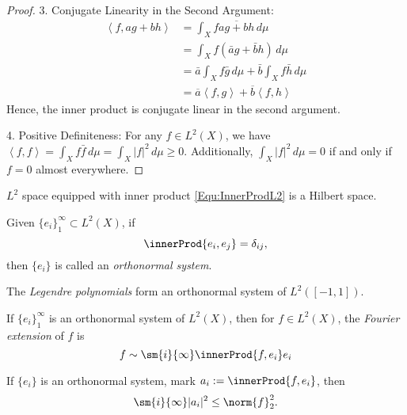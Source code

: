 \begin{proof}
3. Conjugate Linearity in the Second Argument:
   \begin{align*}
   \left<f, ag + bh\right> &= \int_{X}f\overline{ag + bh}\,
   d\mu \\
   &= \int_{X}f(\bar{a}g + \bar{b}h)\,d\mu \\
   &= \bar{a}\int_{X}f\bar{g}\,d\mu + \bar{b}\int_{X}f\bar{h}\,
   d\mu \\
   &= \overline{a}\left<f,g\right> + \overline{b}\left<f,h\right>
   \end{align*}
   Hence, the inner product is conjugate linear in the 
   second argument.

4. Positive Definiteness:
   For any $f \in L^2(X)$, we have $\left<f,f\right> = 
   \int_{X}f\bar{f}\,d\mu = \int_{X}|f|^2\,d\mu \geq 0$. 
   Additionally, $\int_{X}|f|^2\,d\mu = 0$ if and only if 
   $f = 0$ almost everywhere.
\end{proof}
\begin{thm}
    $L^{2}$ space equipped with inner product \eqref{Equ:InnerProdL2} 
    is a Hilbert space. 
\end{thm}
\begin{defn}
    \label{Defn:OrthonormalSet}
    Given $\{e_{i}\}_{1}^{\infty}\subset L^{2}(X)$, if 
    \begin{displaymath}
        \innerProd{e_i,e_{j}}=\delta_{ij},
    \end{displaymath}
    then $\{e_{i}\}$ is called an \textit{orthonormal system}.
\end{defn}
\begin{exm}
    The \textit{Legendre polynomials} form an orthonormal 
    system of $L^{2}([-1,1])$.
\end{exm}
\begin{defn}
    If $\{e_{i}\}_{1}^{\infty}$ is an orthonormal 
    system of $L^{2}(X)$, then for $f\in L^{2}(X)$, the 
    \textit{Fourier extension} of $f$ is 
    \begin{displaymath}
        f\sim\sm{i}{\infty}\innerProd{f,e_i}e_i
    \end{displaymath}
\end{defn}
\begin{thm}
    If $\{e_{i}\}$ is an orthonormal system, 
    mark $a_{i}:=\innerProd{f,e_i}$, then 
    \begin{displaymath}
        \sm{i}{\infty}|a_{i}|^{2}\le\norm{f}_{2}^{2}.
    \end{displaymath}
\end{thm}

